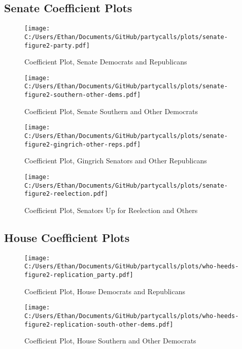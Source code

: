 \documentclass[12pt]{article}
\begin{document}
\clearpage

\subsection{Senate Coefficient Plots}

\begin{figure}[ht]
	\centering
	\caption{Coefficient Plot, Senate Democrats and Republicans}
	\texttt{[image: C:/Users/Ethan/Documents/GitHub/partycalls/plots/senate-figure2-party.pdf]}
\end{figure}

\begin{figure}[ht]
	\centering
	\caption{Coefficient Plot, Senate Southern and Other Democrats}
	\texttt{[image: C:/Users/Ethan/Documents/GitHub/partycalls/plots/senate-figure2-southern-other-dems.pdf]}
\end{figure}

\begin{figure}[ht]
	\centering
	\caption{Coefficient Plot, Gingrich Senators and Other Republicans}
	\texttt{[image: C:/Users/Ethan/Documents/GitHub/partycalls/plots/senate-figure2-gingrich-other-reps.pdf]}
\end{figure}

\begin{figure}[ht]
	\centering
	\caption{Coefficient Plot, Senators Up for Reelection and Others}
	\texttt{[image: C:/Users/Ethan/Documents/GitHub/partycalls/plots/senate-figure2-reelection.pdf]}
\end{figure}

\clearpage

\subsection{House Coefficient Plots}

\begin{figure}[ht]
	\centering
	\caption{Coefficient Plot, House Democrats and Republicans}
	\texttt{[image: C:/Users/Ethan/Documents/GitHub/partycalls/plots/who-heeds-figure2-replication\_party.pdf]}
\end{figure}

\begin{figure}[ht]
	\centering
	\caption{Coefficient Plot, House Southern and Other Democrats}
	\texttt{[image: C:/Users/Ethan/Documents/GitHub/partycalls/plots/who-heeds-figure2-replication-south-other-dems.pdf]}
\end{figure}
\end{document}
